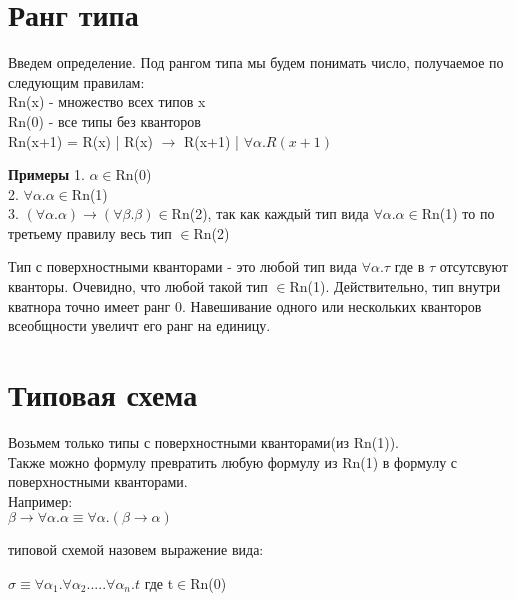 	\section{Ранг типа}
	\begin{definition}
		 Введем определение. Под {рангом типа} мы будем понимать число, получаемое по следующим правилам: \\
	    Rn(x) - множество всех типов x\\
	    Rn(0) - все типы без кванторов\\
	    Rn(x+1) = R(x) | R(x) $\rightarrow$ R(x+1) | $\forall\alpha.R(x+1)$
	\end{definition}
	 
	\textbf{Примеры}
	 1. $ \alpha\in $Rn(0) \\
	 2. $ \forall\alpha.\alpha \in$Rn(1)\\
	 3. $ (\forall\alpha.\alpha)\rightarrow(\forall\beta.\beta) \in$Rn(2), так как каждый тип вида $ \forall\alpha.\alpha \in$Rn(1) то по третьему правилу весь тип $ \in $Rn(2) \\

	\begin{definition}
		Тип с поверхностными кванторами - это любой тип вида $ \forall\alpha.\tau $ где в $ \tau $ отсутсвуют кванторы. Очевидно, что любой такой тип $ \in $Rn(1). Действительно, тип внутри кватнора точно имеет ранг 0. Навешивание одного или нескольких кванторов всеобщности увеличт его ранг на единицу.
	\end{definition}
	 
	 \section{Типовая схема}
	 Возьмем только типы с поверхностными кванторами(из Rn(1)). \\
	 Также можно формулу превратить любую формулу из Rn(1) в формулу с поверхностными кванторами. \\
	 Например:\\ 
	 $ \beta\rightarrow\forall\alpha.\alpha\equiv\forall\alpha.(\beta\rightarrow\alpha) $
	 \\
	 
	 \begin{definition}
	 	{типовой схемой} назовем выражение вида: 

\begin{center}
		 $ \sigma\equiv\forall\alpha_1.\forall\alpha_2.....\forall\alpha_n.t $ где t$ \in $Rn(0)
\end{center}
	 	 \end{definition}
 	 
